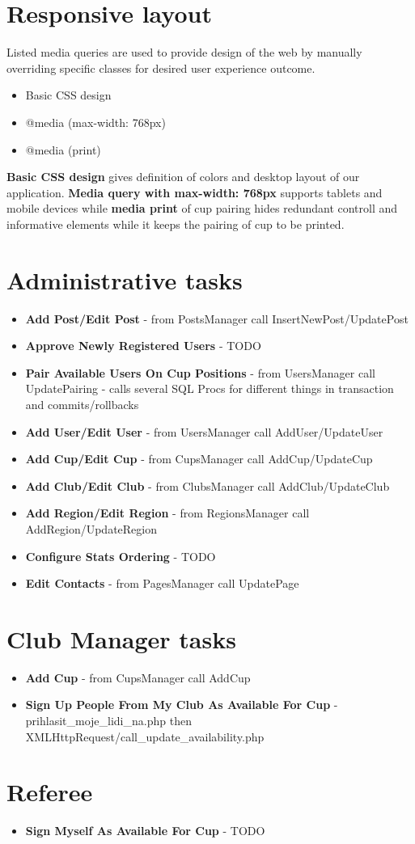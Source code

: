 \section{Responsive layout}
Listed media queries are used to provide design of the web by manually overriding specific classes for desired user experience outcome.
\begin{itemize}
    \item Basic CSS design
    \item @media (max-width: 768px)
    \item @media (print)
\end{itemize}
\textbf{Basic CSS design} gives definition of colors and desktop layout of our application. \textbf{Media query with max-width: 768px} supports tablets and mobile devices while \textbf{media print} of cup pairing hides redundant controll and informative elements while it keeps the pairing of cup to be printed.
\section{Administrative tasks}
\begin{itemize}
    \item \textbf{Add Post/Edit Post} - from PostsManager call InsertNewPost/UpdatePost
    \item \textbf{Approve Newly Registered Users} - TODO
    \item \textbf{Pair Available Users On Cup Positions} - from UsersManager call UpdatePairing - calls several SQL Procs for different things in transaction and commits/rollbacks
    \item \textbf{Add User/Edit User} - from UsersManager call AddUser/UpdateUser
    \item \textbf{Add Cup/Edit Cup} - from CupsManager call AddCup/UpdateCup
    \item \textbf{Add Club/Edit Club} - from ClubsManager call AddClub/UpdateClub
    \item \textbf{Add Region/Edit Region} - from RegionsManager call AddRegion/UpdateRegion
    \item \textbf{Configure Stats Ordering} - TODO
    \item \textbf{Edit Contacts} - from PagesManager call UpdatePage
\end{itemize} 
\section{Club Manager tasks}
\begin{itemize}
    \item \textbf{Add Cup} - from CupsManager call AddCup
    \item \textbf{Sign Up People From My Club As Available For Cup} - prihlasit\_moje\_lidi\_na.php then XMLHttpRequest/call\_update\_availability.php
\end{itemize}   
\section{Referee}    
\begin{itemize}
    \item \textbf{Sign Myself As Available For Cup} - TODO
\end{itemize}